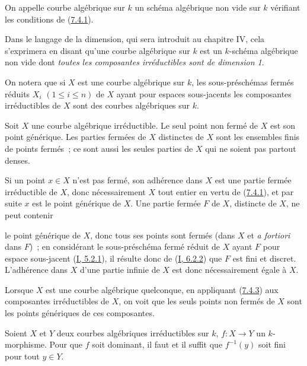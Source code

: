 \begin{definition}[7.4.2]
\label{II.7.4.2-fr}
On appelle courbe algébrique sur $k$ un schéma algébrique non vide sur $k$
vérifiant les conditions de (\hyperref[II.7.4.1-fr]{7.4.1}).
\end{definition}

Dans le langage de la dimension, qui sera introduit au chapitre IV, cela
s'exprimera en disant qu'une courbe algébrique sur $k$ est un $k$-schéma
algébrique non vide dont \emph{toutes les composantes irréductibles sont de
dimension 1}.

On notera que si $X$ est une courbe algébrique sur $k$, les sous-préschémas
fermés réduits $X_i$ $(1\leq i\leq n)$ de $X$ ayant pour espaces sous-jacents
les composantes irréductibles de $X$ sont des courbes algébriques sur $k$.

\begin{corollary}[7.4.3]
\label{II.7.4.3-fr}
Soit $X$ une courbe algébrique irréductible. Le seul point non fermé de $X$ est
son point générique. Les parties fermées de $X$ distinctes de $X$ sont les
ensembles finis de points fermés~; ce sont aussi les seules parties de $X$ qui
ne soient pas partout denses.
\end{corollary}

Si un point $x\in X$ n'est pas fermé, son adhérence dans $X$ est une partie
fermée irréductible de $X$, donc nécessairement $X$ tout entier en vertu de
(\hyperref[II.7.4.1-fr]{7.4.1}), et par suite $x$ est le point générique de
$X$. Une partie fermée $F$ de $X$, distincte de $X$, ne peut contenir

le point générique de $X$, donc tous ses points sont fermés (dans $X$ et
\emph{a fortiori} dans $F$)~; en considérant le sous-préschéma fermé réduit de
$X$ ayant $F$ pour espace sous-jacent (\hyperref[I.5.2.1-fr]{I, 5.2.1}), il
résulte donc de (\hyperref[I.6.2.2-fr]{I, 6.2.2}) que $F$ est fini et discret.
L'adhérence dans $X$ d'une partie infinie de $X$ est donc nécessairement égale
à $X$.

Lorsque $X$ est une courbe algébrique quelconque, en appliquant
(\hyperref[II.7.4.3-fr]{7.4.3}) aux composantes irréductibles de $X$, on voit
que les seuls points non fermés de $X$ sont les points génériques de ces
composantes.

\begin{corollary}[7.4.4]
\label{II.7.4.4-fr}
Soient $X$ et $Y$ deux courbes algébriques irréductibles sur $k$, $f:X\to Y$
un $k$-morphisme. Pour que $f$ soit dominant, il faut et il suffit que
$f^{-1}(y)$ soit fini pour tout $y\in Y$.
\end{corollary}

